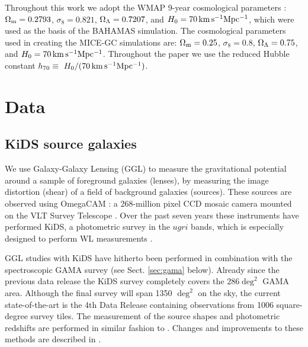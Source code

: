 \documentclass[fleqn,usenatbib]{mnras}
\begin{document}
Throughout this work we adopt the WMAP 9-year \cite[]{hinshaw2013} cosmological parameters : $\Omega_{\rm m}=0.2793$, $\sigma_8=0.821$, $\Omega_{\rm \Lambda}=0.7207$, and $H_0 = 70 \, {\rm km \, s^{-1} Mpc^{-1}}$, which were used as the basis of the BAHAMAS simulation.
The cosmological parameters used in creating the MICE-GC simulations are: $\Omega_{\rm m}=0.25$, $\sigma_8=0.8$, $\Omega_{\rm \Lambda}=0.75$, and $H_0 = 70 \, {\rm km \, s^{-1} Mpc^{-1}}$.
Throughout the paper we use the reduced Hubble constant $h_{70} \equiv \ H_0 / (70 \, {\rm km \, s^{-1} Mpc^{-1}})$.

\section{Data}
\label{sec:data}

\subsection{KiDS source galaxies}
\label{sec:kids}

We use Galaxy-Galaxy Lensing (GGL) to measure the gravitational potential around a sample of foreground galaxies (lenses), by measuring the image distortion (shear) of a field of background galaxies (sources). These sources are observed using OmegaCAM \cite[]{kuijken2011}: a 268-million pixel CCD mosaic
camera mounted on the VLT Survey Telescope \cite[]{capaccioli2011}. Over the past seven years these instruments have performed KiDS, a photometric survey in the $ugri$ bands, which is especially designed to perform WL measurements \cite[]{dejong2013}.

GGL studies with KiDS have hitherto been performed in combination with the spectroscopic GAMA survey (see Sect. \ref{sec:gama} below). Already since the previous data release \cite[KiDS-DR3,][]{dejong2017} the KiDS survey completely covers the $286 \deg^2$ GAMA area. Although the final survey will span 1350 $\deg^2$ on the sky, the current state-of-the-art is the 4th Data Release \cite[KiDS-DR4,][]{kuijken2019} containing observations from 1006 square-degree survey tiles. The measurement of the source shapes and photometric redshifts are performed in similar fashion to \cite{dejong2017}. Changes and improvements to these methods are described in \cite{kuijken2019}. 
\end{document}
